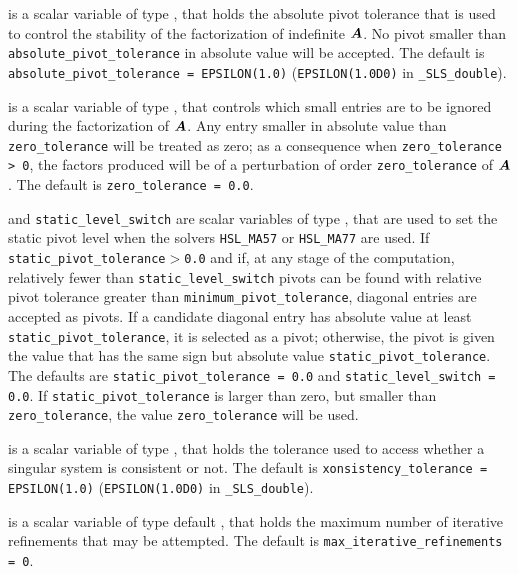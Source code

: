 \documentclass{galahad}
\newcommand{\packagename}{SLS}
\newcommand{\fullpackagename}{\libraryname\_\-\packagename}
\begin{document}
\begin{description}
 is a scalar variable of type \realdp, that
holds the absolute pivot tolerance that is used to control the
stability of the factorization of indefinite ${\bm{A}}$.
No pivot smaller than {\tt absolute\_pivot\_tolerance} in
absolute value will be accepted.
The default is {\tt absolute\_pivot\_\-tolerance = EPSILON(1.0)}
({\tt EPSILON(1.0D0)} in {\tt \fullpackagename\_double}).

 is a scalar variable of type \realdp, that
controls which small entries are to be ignored during the factorization
of ${\bm{A}}$. Any entry smaller in absolute value than
{\tt zero\_\-tolerance} will be treated as zero; as a consequence when
{\tt zero\_tolerance > 0}, the factors produced will be of a perturbation
of order {\tt zero\_tolerance} of ${\bm{A}}$.
The default is {\tt zero\_tolerance = 0.0}.

 and {\tt static\_level\_switch} are
scalar variables of type \realdp, that are used to set the static pivot
level when the solvers {\tt HSL\_MA57} or {\tt HSL\_MA77} are used.
If {\tt static\_pivot\_tolerance$>$0.0} and if,
at any stage of the computation, relatively fewer
than {\tt static\_level\_\-switch}
pivots can be found with relative pivot tolerance greater than
{\tt minimum\_pivot\_tolerance},  diagonal entries are accepted as pivots. If
a candidate diagonal entry has absolute value
at least {\tt static\_pivot\_tolerance}, it is
selected as a pivot; otherwise, the pivot is given the value
that has the same sign but absolute value {\tt static\_pivot\_tolerance}.
The defaults are {\tt static\_pivot\_tolerance = 0.0} and
{\tt static\_level\_switch = 0.0}.
If {\tt static\_pivot\_tolerance}
is larger than zero, but smaller than {\tt zero\_tolerance},
the value {\tt zero\_\-tolerance} will be used.

 is a scalar variable of type \realdp, that holds
the tolerance used to access whether a singular system is consistent or not.
The default is {\tt xonsistency\_\-tolerance = EPSILON(1.0)}
({\tt EPSILON(1.0D0)} in {\tt \fullpackagename\_double}).

 is a scalar variable of type default
\integer, that holds
the maximum number of iterative refinements that may be attempted.
The default is {\tt max\_iterative\_refinements = 0}.


\end{description}
\end{document}
